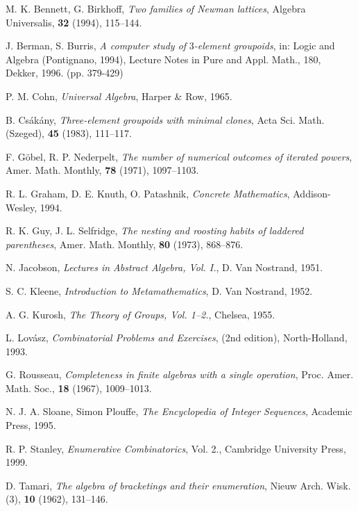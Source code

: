 \documentclass[a4paper,reqno]{amsart}\usepackage{amssymb,latexsym}
\theoremstyle{definition}
\theoremstyle{remark}
\numberwithin{equation}{section}
\numberwithin{theorem}{section}
\begin{document}
\begin{thebibliography}{99}                                                                                               

M. K. Bennett, G. Birkhoff, \textit{Two families of Newman
lattices}, Algebra Universalis, \textbf{32 }(1994), 115--144.

J. Berman, S. Burris, \textit{A computer study of }$3$\textit{-element groupoids}, in: Logic and Algebra (Pontignano, 1994),
Lecture Notes in Pure and Appl. Math., 180, Dekker, 1996. (pp. 379-429)

P. M. Cohn, \textit{Universal Algebra}, Harper \& Row, 1965.

B. Cs\'{a}k\'{a}ny, \textit{Three-element groupoids with minimal
clones}, Acta Sci. Math. (Szeged), \textbf{45 }(1983), 111--117.

F. G\"{o}bel, R. P. Nederpelt, \textit{The number of numerical
outcomes of iterated powers}, Amer. Math. Monthly, \textbf{78 }(1971), 1097--1103.

R. L. Graham, D. E. Knuth, O. Patashnik, \textit{Concrete
Mathematics}, Addison-Wesley, 1994.

R. K. Guy, J. L. Selfridge, \textit{The nesting and roosting
habits of laddered parentheses}, Amer. Math. Monthly, \textbf{80 }(1973), 868--876.

N. Jacobson, \textit{Lectures in Abstract Algebra, Vol. I.}, D.
Van Nostrand, 1951.

S. C. Kleene, \textit{Introduction to Metamathematics}, D. Van
Nostrand, 1952.

A. G. Kurosh, \textit{The Theory of Groups, Vol. 1--2.},
Chelsea, 1955.

L. Lov\'{a}sz, \textit{Combinatorial Problems and Exercises},
(2nd edition), North-Holland, 1993.

G. Rousseau, \textit{Completeness in finite algebras with a
single operation}, Proc. Amer. Math. Soc., \textbf{18 }(1967), 1009--1013.

N. J. A. Sloane, Simon Plouffe, \textit{The Encyclopedia of
Integer Sequences}, Academic Press, 1995.

R. P. Stanley, \textit{Enumerative Combinatorics}, Vol. 2.,
Cambridge University Press, 1999.

D. Tamari, \textit{The algebra of bracketings and their
enumeration}, Nieuw Arch. Wisk. (3), \textbf{10 }(1962), 131--146.
\end{thebibliography}
\end{document}
